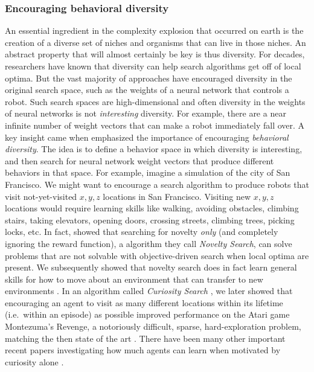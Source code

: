 \documentclass{article}
\begin{document}
\subsubsection{Encouraging behavioral diversity}

An essential ingredient in the complexity explosion that occurred on earth is the creation of a diverse set of niches and organisms that can live in those niches. An abstract property that will almost certainly be key is thus diversity. For decades, researchers have known that diversity can help search algorithms get off of local optima. But the vast majority of approaches have encouraged diversity in the original search space, such as the weights of a neural network that controls a robot. Such search spaces are high-dimensional and often diversity in the weights of neural networks is not \emph{interesting} diversity. For example, there are a near infinite number of weight vectors that can make a robot immediately fall over. A key insight came when \citet{lehman2011abandoning} emphasized the importance of encouraging \emph{behavioral diversity}. The idea is to define a behavior space in which diversity is interesting, and then search for neural network weight vectors that produce different behaviors in that space. For example, imagine a simulation of the city of San Francisco. We might want to encourage a search algorithm to produce robots that visit not-yet-visited $x,y,z$ locations in San Francisco. Visiting new $x,y,z$ locations would require learning skills like walking, avoiding obstacles, climbing stairs, taking elevators, opening doors, crossing streets, climbing trees, picking locks, etc. In fact, \citet{lehman2011abandoning} showed that searching for novelty \emph{only} (and completely ignoring the reward function), a algorithm they call \emph{Novelty Search}, can solve problems that are not solvable with objective-driven search when local optima are present. We subsequently showed that novelty search does in fact learn general skills for how to move about an environment that can transfer to new environments \cite{velez2014novelty}. In an algorithm called \emph{Curiosity Search} \cite{stanton2016curiosity}, we later showed that encouraging an agent to visit as many different locations within its lifetime (i.e.\ within an episode) as possible improved performance on the Atari game Montezuma's Revenge, a notoriously difficult, sparse, hard-exploration problem, matching the then state of the art \cite{stanton2018deepCS}. There have been many other important recent papers investigating how much agents can learn when motivated by curiosity alone \cite{burda2018large,pathak2017curiosity,oudeyer2009intrinsic,savinov2018episodic,eysenbach2018diversity,gupta2018unsupervised,oudeyer2007intrinsic,schmidhuber2010formal}.
\end{document}
